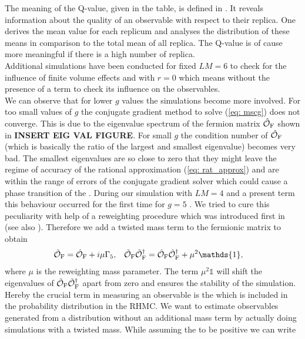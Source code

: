 %
%
%

%
%
%
The meaning of the Q-value, given in the table, is defined in \cite{Wolff:2003sm}. It reveals information about the quality of an observable with respect to their replica. One derives the mean value for each replicum and analyses the distribution of these means in comparison to the total mean of all replica. The Q-value is of cause more meaningful if there is a high number of replica. \\
%

Additional simulations have been conducted for fixed $LM=6$ to check for the influence of finite volume effects and with $r=0$ which means without the presence of a  term to check its influence on the observables.\\
We can observe that for lower $g$ values the simulations become more involved. For too small values of $g$ the conjugate gradient method to solve (\ref{eq: mscg}) does not converge. This is due to the eigenvalue spectrum of the fermion matrix $\hat{\mathcal{O}}_{\rm F}$ shown in {\LARGE \bf INSERT EIG VAL FIGURE}. For small $g$ the condition number of $\hat{\mathcal{O}}_{\rm F}$ (which is basically the ratio of the largest and smallest eigenvalue) becomes very bad. The smallest eigenvalues are so close to zero that they might leave the regime of accuracy of the rational approximation (\ref{eq: rat_approx}) and are within the range of errors of the conjugate gradient solver which could cause a phase transition of the . During our simulation with $LM=4$ and a present  term this behaviour occurred for the first time for $g=5$ . We tried to cure this peculiarity with help of a reweighting procedure which was introduced first in \cite{Ferrenberg:1988yz} (see also \cite{Luscher:2008tw,Finkenrath:2013soa}). Therefore we add a twisted mass term to the fermionic matrix to obtain
%
%
\begin{align}
\tilde{\mathcal{O}}_{\rm F} &= \hat{\mathcal{O}}_{\rm F} + i\mu \Gamma_{5},  &
\tilde{\mathcal{O}}_{\rm F} \tilde{\mathcal{O}}_{\rm F}^{\dagger} &= \hat{\mathcal{O}}_{\rm F}\hat{\mathcal{O}}_{\rm F}^{\dagger} + \mu^{2}\mathds{1},
\end{align}
%
%
where $\mu$ is the reweighting mass parameter. The term $\mu^{2}\mathds{1}$ will shift the eigenvalues of $\tilde{\mathcal{O}}_{\rm F} \tilde{\mathcal{O}}_{\rm F}^{\dagger}$ apart from zero and ensures the stability of the simulation. Hereby the crucial term in measuring an observable is the  which is included in the probability distribution in the RHMC. We want to estimate observables generated from a distribution without an additional mass term by actually doing simulations with a twisted mass. While assuming the  to be positive we can write
